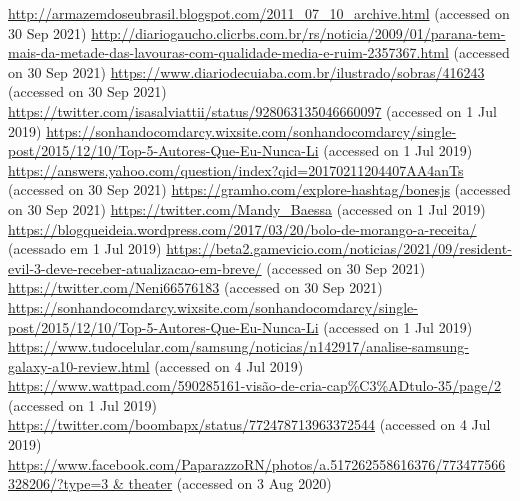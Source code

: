 \documentclass[output=paper]{langscibook}
\begin{document}
\begin{exe}\sloppy
    \z
    \ea \url{http://armazemdoseubrasil.blogspot.com/2011_07_10_archive.html} {(accessed on 30 Sep 2021)}
        \ex \url{http://diariogaucho.clicrbs.com.br/rs/noticia/2009/01/parana-tem-mais-da-metade-das-lavouras-com-qualidade-media-e-ruim-2357367.html} {(accessed on 30 Sep 2021)}
        \ex \url{https://www.diariodecuiaba.com.br/ilustrado/sobras/416243} {(accessed on 30 Sep 2021)}
    \z
      \ea \url{https://twitter.com/isasalviattii/status/928063135046660097} {(accessed on 1 Jul 2019)}
      \ex \url{https://sonhandocomdarcy.wixsite.com/sonhandocomdarcy/single-post/2015/12/10/Top-5-Autores-Que-Eu-Nunca-Li} {(accessed on 1 Jul 2019)}
    \z
        \ea \url{https://answers.yahoo.com/question/index?qid=20170211204407AA4anTs} {(accessed on 30 Sep 2021)}
        \ex \url{https://gramho.com/explore-hashtag/bonesjs} {(accessed on 30 Sep 2021)}
    \z
        \ea \url{https://twitter.com/Mandy_Baessa} {(accessed on 1 Jul 2019)}
        \ex \url{https://blogqueideia.wordpress.com/2017/03/20/bolo-de-morango-a-receita/} {(acessado em 1 Jul 2019)}
    \z
        \ea \url{https://beta2.gamevicio.com/noticias/2021/09/resident-evil-3-deve-receber-atualizacao-em-breve/} {(accessed on 30 Sep 2021)}
        \ex \url{https://twitter.com/Neni66576183} {(accessed on 30 Sep 2021)}
    \z
        \ea \url{https://sonhandocomdarcy.wixsite.com/sonhandocomdarcy/single-post/2015/12/10/Top-5-Autores-Que-Eu-Nunca-Li} {(accessed on 1 Jul 2019)}
        \ex \url{https://www.tudocelular.com/samsung/noticias/n142917/analise-samsung-galaxy-a10-review.html} {(accessed on 4 Jul 2019)}
    \z
        \ea \url{https://www.wattpad.com/590285161-visão-de-cria-cap\%C3\%ADtulo-35/page/2} {(accessed on 1 Jul 2019)}
        \ex \url{https://twitter.com/boombapx/status/772478713963372544} {(accessed on 4 Jul 2019)}
    \z
        \ea \url{https://www.facebook.com/PaparazzoRN/photos/a.517262558616376/773477566328206/?type=3 & theater} {(accessed on 3 Aug 2020)}

\end{exe}
\end{document}
